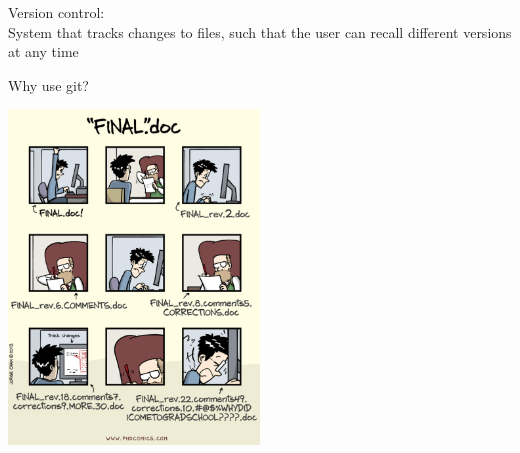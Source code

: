 \documentclass[12pt]{beamer}
\begin{document}
\begin{frame}

	{\Large \textcolor{boss3}{Version control:}} \\

	\bigskip
	\textcolor{boss4}{System that tracks changes to files, such that the user can recall different versions at any time}

\end{frame}





\begin{frame}

	\begin{flushright}
		\Large \textcolor{boss2}{Why use git?} 
	\end{flushright}

	\begin{center}
	  \includegraphics[width=0.5\textwidth]{figs/phd101212s.pdf}
	\end{center}

\end{frame}
\end{document}
